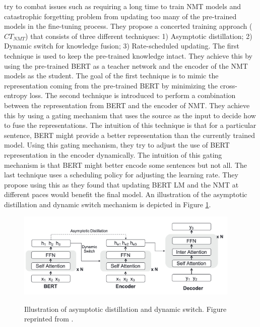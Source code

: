 \cite{yang2020towards} try to combat issues such as requiring a long time to train NMT models and catastrophic forgetting problem from updating too many of the pre-trained models in the fine-tuning process. They propose a concerted training approach ($CT_{NMT}$) that consists of three different techniques: 1) Asymptotic distillation; 2) Dynamic switch for knowledge fusion; 3) Rate-scheduled updating. The first technique is used to keep the pre-trained knowledge intact. They achieve this by using the pre-trained BERT as a teacher network and the encoder of the NMT models as the student. The goal of the first technique is to mimic the representation coming from the pre-trained BERT by minimizing the cross-entropy loss. The second technique is introduced to perform a combination between the representation from BERT and the encoder of NMT. They achieve this by using a gating mechanism that uses the source as the input to decide how to fuse the representations. The intuition of this technique is that for a particular sentence, BERT might provide a better representation than the currently trained model. Using this gating mechanism, they try to adjust the use of BERT representation in the encoder dynamically. The intuition of this gating mechanism is that BERT might better encode some sentences but not all. The last technique uses a scheduling policy for adjusting the learning rate. They propose using this as they found that updating BERT LM and the NMT at different paces would benefit the final model. An illustration of the asymptotic distillation and dynamic switch mechanism is depicted in Figure \ref{img:ctnmt}.

\begin{figure}[h]
    {\includegraphics[width=0.95\textwidth]{img/ctnmt.png}}
    \centering
    \caption{Illustration of asymptotic distillation and dynamic switch. Figure reprinted from \cite{yang2020towards}.}
    \label{img:ctnmt}
\end{figure}

